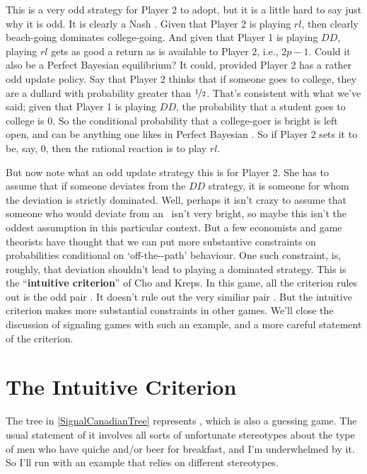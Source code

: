 This is a very odd strategy for Player 2 to adopt, but it is a little hard to say just why it is odd. It is clearly a Nash \eqm. Given that Player 2 is playing $rl$, then clearly beach-going dominates college-going. And given that Player 1 is playing $DD$, playing $rl$ gets as good a return as is available to Player 2, i.e., $2p-1$. Could it also be a Perfect Bayesian equilibrium? It could, provided Player 2 has a rather odd update policy. Say that Player 2 thinks that if someone goes to college, they are a dullard with probability greater than $\nicefrac{1}{2}$. That's consistent with what we've said; given that Player 1 is playing $DD$, the probability that a student goes to college is 0. So the conditional probability that a college-goer is bright is left open, and can be anything one likes in Perfect Bayesian \eqm. So if Player 2 sets it to be, say, 0, then the rational reaction is to play $rl$.

But now note what an odd update strategy this is for Player 2. She has to assume that if someone deviates from the $DD$ strategy, it is someone for whom the deviation is strictly dominated. Well, perhaps it isn't crazy to assume that someone who would deviate from an \eqm\ isn't very bright, so maybe this isn't the oddest assumption in this particular context. But a few economists and game theorists have thought that we can put more substantive constraints on probabilities conditional on `off-the-\eqm-path' behaviour. One such constraint, is, roughly, that deviation shouldn't lead to playing a dominated strategy. This is the ``\textbf{intuitive criterion}'' of Cho and Kreps. In this game, all the criterion rules out is the odd pair . It doesn't rule out the very similiar pair . But the intuitive criterion makes more substantial constraints in other games. We'll close the discussion of signaling games with such an example, and a more careful statement of the criterion.

\section{The Intuitive Criterion}

The tree in \ref{SignalCanadianTree} represents , which is also a guessing game. The usual statement of it involves all sorts of unfortunate stereotypes about the type of men who have quiche and/or beer for breakfast, and I'm underwhelmed by it. So I'll run with an example that relies on different stereotypes.

